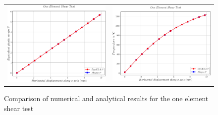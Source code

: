 \begin{figure}[h]
\begin{centering}
\begin{tabular}{cc}
\includegraphics[width=0.45\columnwidth]{Figures/Samples/Element/Shear-Plastic_plasticStrain} & \includegraphics[width=0.45\columnwidth]{Figures/Samples/Element/Shear-Plastic_temperature}\tabularnewline
\end{tabular}
\par\end{centering}
\caption{Comparison of numerical and analytical results for the one element
shear test\label{fig:Samples!Single!Shear-Comparison}}
\end{figure}

